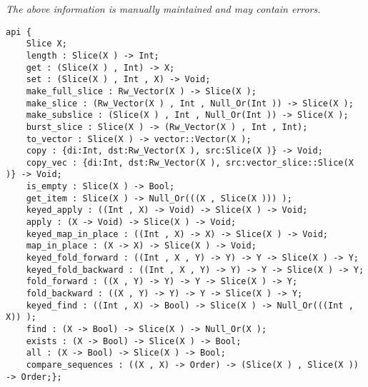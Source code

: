 \label{api:Rw\_Vector\_Slice}

{\tiny \it The above information is manually maintained and may contain errors.}
\begin{verbatim}
api {
    Slice X;
    length : Slice(X ) -> Int;
    get : (Slice(X ) , Int) -> X;
    set : (Slice(X ) , Int , X) -> Void;
    make_full_slice : Rw_Vector(X ) -> Slice(X );
    make_slice : (Rw_Vector(X ) , Int , Null_Or(Int )) -> Slice(X );
    make_subslice : (Slice(X ) , Int , Null_Or(Int )) -> Slice(X );
    burst_slice : Slice(X ) -> (Rw_Vector(X ) , Int , Int);
    to_vector : Slice(X ) -> vector::Vector(X );
    copy : {di:Int, dst:Rw_Vector(X ), src:Slice(X )} -> Void;
    copy_vec : {di:Int, dst:Rw_Vector(X ), src:vector_slice::Slice(X )} -> Void;
    is_empty : Slice(X ) -> Bool;
    get_item : Slice(X ) -> Null_Or(((X , Slice(X ))) );
    keyed_apply : ((Int , X) -> Void) -> Slice(X ) -> Void;
    apply : (X -> Void) -> Slice(X ) -> Void;
    keyed_map_in_place : ((Int , X) -> X) -> Slice(X ) -> Void;
    map_in_place : (X -> X) -> Slice(X ) -> Void;
    keyed_fold_forward : ((Int , X , Y) -> Y) -> Y -> Slice(X ) -> Y;
    keyed_fold_backward : ((Int , X , Y) -> Y) -> Y -> Slice(X ) -> Y;
    fold_forward : ((X , Y) -> Y) -> Y -> Slice(X ) -> Y;
    fold_backward : ((X , Y) -> Y) -> Y -> Slice(X ) -> Y;
    keyed_find : ((Int , X) -> Bool) -> Slice(X ) -> Null_Or(((Int , X)) );
    find : (X -> Bool) -> Slice(X ) -> Null_Or(X );
    exists : (X -> Bool) -> Slice(X ) -> Bool;
    all : (X -> Bool) -> Slice(X ) -> Bool;
    compare_sequences : ((X , X) -> Order) -> (Slice(X ) , Slice(X )) -> Order;};
\end{verbatim}
